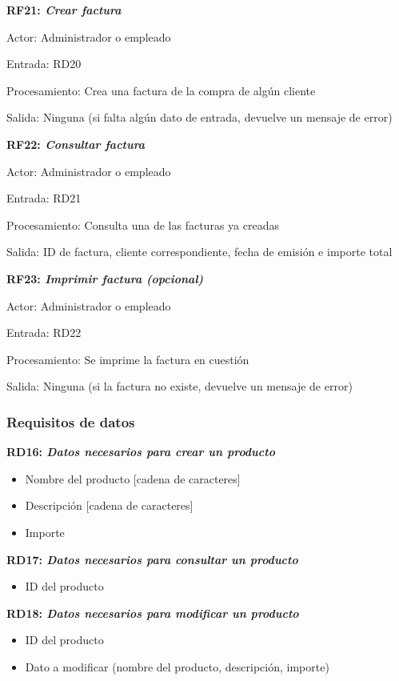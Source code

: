 \documentclass[paper=a4, fontsize=11pt, spanish]{scrartcl}
\begin{document}
\setlength{\parindent}{0em}
\textbf{RF21: \textit{Crear factura}}
\setlength{\parindent}{2em}

Actor: Administrador o empleado

Entrada: RD20

Procesamiento: Crea una factura de la compra de algún cliente 

Salida: Ninguna (si falta algún dato de entrada, devuelve un mensaje de error)

\setlength{\parindent}{0em}
\textbf{RF22: \textit{Consultar factura}}
\setlength{\parindent}{2em}

Actor: Administrador o empleado

Entrada: RD21

Procesamiento: Consulta una de las facturas ya creadas 

Salida: ID de factura, cliente correspondiente, fecha de emisión e importe total

\setlength{\parindent}{0em}
\textbf{RF23: \textit{Imprimir factura (opcional)}}
\setlength{\parindent}{2em}

Actor: Administrador o empleado

Entrada: RD22

Procesamiento: Se imprime la factura en cuestión

Salida: Ninguna (si la factura no existe, devuelve un mensaje de error)


\subsubsection{Requisitos de datos}
\setlength{\parindent}{0em}
\textbf{RD16: \textit{Datos necesarios para crear un producto}}
\setlength{\parindent}{2em}
\begin{itemize}
	\item Nombre del producto [cadena de caracteres]
	\item Descripción [cadena de caracteres]
	\item Importe
\end{itemize}

\setlength{\parindent}{0em}
\textbf{RD17: \textit{Datos necesarios para consultar un producto}}
\setlength{\parindent}{2em}
\begin{itemize}
	\item ID del producto
\end{itemize}

\setlength{\parindent}{0em}
\textbf{RD18: \textit{Datos necesarios para modificar un producto}}
\setlength{\parindent}{2em}
\begin{itemize}
	\item ID del producto
	\item Dato a modificar (nombre del producto, descripción, importe)
\end{itemize}
\end{document}
